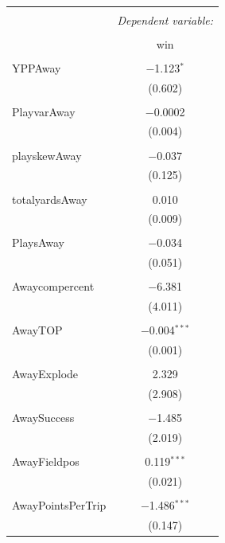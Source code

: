 \documentclass[12pt,english]{article}
\begin{document}
\begin{table}[!htbp] \centering 
  \caption{} 
  \label{Logistic Regression (cont.)} 
\scriptsize 
\begin{tabular}{@{\extracolsep{5pt}}lc} 
\\[-1.8ex]\hline 
\hline \\[-1.8ex] 
 & \multicolumn{1}{c}{\textit{Dependent variable:}} \\ 
\cline{2-2} 
\\[-1.8ex] & win \\ 
\hline \\[-1.8ex] 
 YPPAway & $-$1.123$^{*}$ \\ 
  & (0.602) \\ 
  & \\ 
 PlayvarAway & $-$0.0002 \\ 
  & (0.004) \\ 
  & \\ 
 playskewAway & $-$0.037 \\ 
  & (0.125) \\ 
  & \\ 
 totalyardsAway & 0.010 \\ 
  & (0.009) \\ 
  & \\ 
 PlaysAway & $-$0.034 \\ 
  & (0.051) \\ 
  & \\ 
 Awaycompercent & $-$6.381 \\ 
  & (4.011) \\ 
  & \\ 
 AwayTOP & $-$0.004$^{***}$ \\ 
  & (0.001) \\ 
  & \\ 
 AwayExplode & 2.329 \\ 
  & (2.908) \\ 
  & \\ 
 AwaySuccess & $-$1.485 \\ 
  & (2.019) \\ 
  & \\ 
 AwayFieldpos & 0.119$^{***}$ \\ 
  & (0.021) \\ 
  & \\ 
 AwayPointsPerTrip & $-$1.486$^{***}$ \\ 
  & (0.147) \\ 

\end{tabular}
\end{table}
\end{document}
